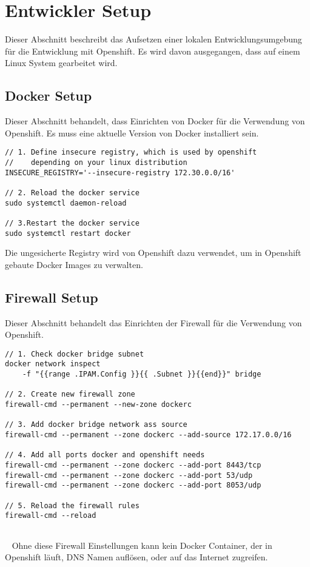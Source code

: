 \section{Entwickler Setup}
\label{sec:dev-setup}
Dieser Abschnitt beschreibt das Aufsetzen einer lokalen Entwicklungsumgebung für die Entwicklung mit Openshift. Es wird davon ausgegangen, dass auf einem Linux System gearbeitet wird.

\subsection{Docker Setup}
Dieser Abschnitt behandelt, dass Einrichten von Docker für die Verwendung von Openshift. Es muss eine aktuelle Version von Docker installiert sein.

\begin{verbatim}
// 1. Define insecure registry, which is used by openshift
//    depending on your linux distribution
INSECURE_REGISTRY='--insecure-registry 172.30.0.0/16'

// 2. Reload the docker service
sudo systemctl daemon-reload

// 3.Restart the docker service
sudo systemctl restart docker
\end{verbatim} 
Die ungesicherte Registry wird von Openshift dazu verwendet, um in Openshift gebaute Docker Images zu verwalten. 

\subsection{Firewall Setup}
Dieser Abschnitt behandelt das Einrichten der Firewall für die Verwendung von Openshift.

\begin{verbatim}
// 1. Check docker bridge subnet
docker network inspect 
	-f "{{range .IPAM.Config }}{{ .Subnet }}{{end}}" bridge

// 2. Create new firewall zone
firewall-cmd --permanent --new-zone dockerc

// 3. Add docker bridge network ass source
firewall-cmd --permanent --zone dockerc --add-source 172.17.0.0/16

// 4. Add all ports docker and openshift needs
firewall-cmd --permanent --zone dockerc --add-port 8443/tcp
firewall-cmd --permanent --zone dockerc --add-port 53/udp
firewall-cmd --permanent --zone dockerc --add-port 8053/udp

// 5. Reload the firewall rules
firewall-cmd --reload
	
\end{verbatim}
\ \newline
Ohne diese Firewall Einstellungen kann kein Docker Container, der in Openshift läuft, DNS Namen auflösen, oder auf das Internet zugreifen.


